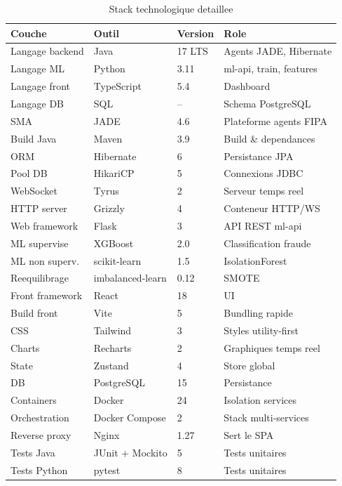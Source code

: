 \documentclass[12pt,a4paper,oneside]{report}
\begin{document}
\begin{table}[H]
\centering
\caption{Stack technologique detaillee}
\label{tab:stack-detaillee}
\renewcommand{\arraystretch}{1.3}
\footnotesize
\begin{tabularx}{\textwidth}{l l l X}
\toprule
\textbf{Couche} & \textbf{Outil} & \textbf{Version} & \textbf{Role} \\
\midrule
Langage backend & Java          & 17 LTS  & Agents JADE, Hibernate \\
Langage ML      & Python        & 3.11    & ml-api, train, features \\
Langage front   & TypeScript    & 5.4     & Dashboard \\
Langage DB      & SQL           & --      & Schema PostgreSQL \\
SMA             & JADE          & 4.6     & Plateforme agents FIPA \\
Build Java      & Maven         & 3.9     & Build \& dependances \\
ORM             & Hibernate     & 6       & Persistance JPA \\
Pool DB         & HikariCP      & 5       & Connexions JDBC \\
WebSocket       & Tyrus         & 2       & Serveur temps reel \\
HTTP server     & Grizzly       & 4       & Conteneur HTTP/WS \\
Web framework   & Flask         & 3       & API REST ml-api \\
ML supervise    & XGBoost       & 2.0     & Classification fraude \\
ML non superv.  & scikit-learn  & 1.5     & IsolationForest \\
Reequilibrage   & imbalanced-learn & 0.12 & SMOTE \\
Front framework & React         & 18      & UI \\
Build front     & Vite          & 5       & Bundling rapide \\
CSS             & Tailwind      & 3       & Styles utility-first \\
Charts          & Recharts      & 2       & Graphiques temps reel \\
State           & Zustand       & 4       & Store global \\
DB              & PostgreSQL    & 15      & Persistance \\
Containers      & Docker        & 24      & Isolation services \\
Orchestration   & Docker Compose & 2      & Stack multi-services \\
Reverse proxy   & Nginx         & 1.27    & Sert le SPA \\
Tests Java      & JUnit + Mockito & 5     & Tests unitaires \\
Tests Python    & pytest        & 8       & Tests unitaires \\
\bottomrule
\end{tabularx}
\end{table}
\end{document}
